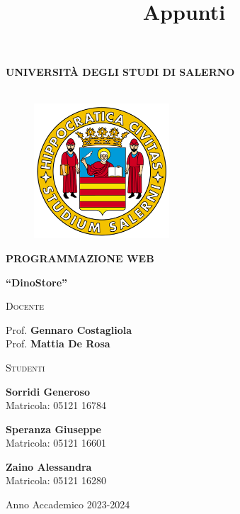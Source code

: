 \documentclass[a4paper, 11pt, onesid]{article}
\title{Appunti}
\author{}
\date{}
\begin{document}
\begin{titlepage}
    \begin{center}
        \LARGE{\uppercase{\textbf{Università degli Studi di Salerno}}}\\
        \vspace{5mm}
        \fontsize{15}{14}\\
    \end{center}
    \begin{figure}[H]
        \centering
        \includegraphics[width=0.45\textwidth]{immagini/logo_standard.png}
    \end{figure}
    
    \begin{center}
        {\LARGE{\bf PROGRAMMAZIONE WEB}}\\
        \fontsize{15}{14}
    	\vspace{5mm}
    \end{center}

    \begin{center}
        {\Large \bfseries ``DinoStore''}
    \end{center}
   
\noindent\begin{minipage}[t]{8cm}
\flushleft
\textsc{Docente}

Prof. \textbf{Gennaro Costagliola} \\
Prof. \textbf{Mattia De Rosa} \\
\end{minipage}
%
\hfill
%
\begin{minipage}[t]{6cm}
\flushright
\textsc{Studenti}

\textbf{Sorridi Generoso} \\
Matricola: 05121 16784

\textbf{Speranza Giuseppe} \\
Matricola: 05121 16601

\textbf{Zaino Alessandra} \\
Matricola: 05121 16280
\end{minipage}


    
    \vspace{15mm}
    \noindent
    
    \vspace{20mm}
    
\centering    
\normalsize Anno Accademico 2023-2024

\end{titlepage}
\end{document}
